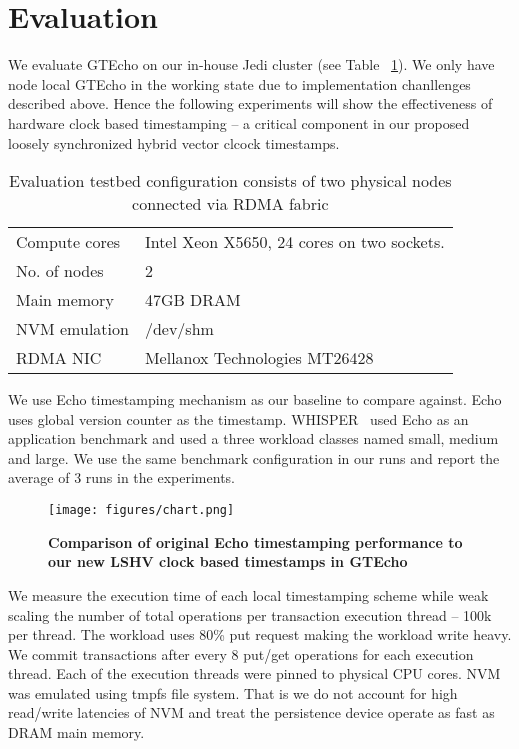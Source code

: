 \section{Evaluation}

We evaluate GTEcho on our in-house Jedi cluster (see Table ~\ref{tab:eval}). 
We only have node local GTEcho in the working
state due to implementation chanllenges described above. Hence the following experiments 
will show the effectiveness of hardware clock based timestamping -- a critical component 
in our proposed loosely synchronized hybrid vector clcock timestamps.

\begin{table}[]
	\begin{tabular}{l|l}
		\hline
		Compute cores	&  Intel Xeon X5650, 24 cores on two sockets. \\
		No. of nodes	  &  2  \\
		Main memory	  &  47GB DRAM \\
		NVM emulation & /dev/shm \\
		RDMA NIC		  & Mellanox Technologies MT26428  \\
		\hline
	\end{tabular}
	\caption{Evaluation testbed configuration consists of two physical nodes connected via RDMA fabric} 
	\label{tab:eval} 
\end{table}

We use Echo timestamping mechanism as our baseline to compare against. Echo uses global version counter as the timestamp. 
WHISPER~\cite{whisper} used Echo as an application benchmark and used a three workload classes named small, medium and large.
We use the same benchmark configuration in our runs and report the average of 3 runs in the experiments.

\begin{figure}[]   
	\centering
	\texttt{[image: figures/chart.png]} 
	\caption{\bf Comparison of original Echo timestamping performance  to our new LSHV clock based timestamps in 
	GTEcho} 
	\label{fig:eval} 
\end{figure}

We measure the execution time of each local timestamping scheme while weak
scaling the number of total operations per transaction execution thread -- 100k per thread.
The workload uses 80\% put request making the workload write heavy. We commit transactions
after every 8 put/get operations for each execution thread. Each of the execution threads were
pinned to physical CPU cores. NVM was emulated using tmpfs file system. That is 
we do not account for high read/write latencies of NVM and treat the persistence
device operate as fast as DRAM main memory.

